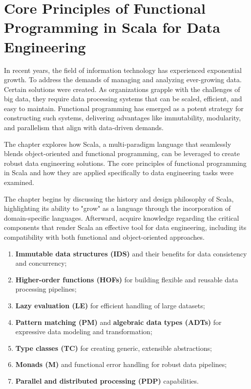 \chapter{Core Principles of Functional Programming in Scala for Data Engineering}

In recent years, the field of information technology has experienced exponential growth. To address the demands of managing and analyzing ever-growing data. Certain solutions were created. As organizations grapple with the challenges of big data, they require data processing systems that can be scaled, efficient, and easy to maintain. Functional programming has emerged as a potent strategy for constructing such systems, delivering advantages like immutability, modularity, and parallelism that align with data-driven demands.

The chapter explores how Scala, a multi-paradigm language that seamlessly blends object-oriented and functional programming, can be leveraged to create robust data engineering solutions. The core principles of functional programming in Scala and how they are applied specifically to data engineering tasks were examined.

The chapter begins by discussing the history and design philosophy of Scala, highlighting its ability to "grow" as a language through the incorporation of domain-specific languages. Afterward, acquire knowledge regarding the critical components that render Scala an effective tool for data engineering, including its compatibility with both functional and object-oriented approaches.

    \begin{enumerate}
        \item \textbf{Immutable data structures (IDS)} and their benefits for data consistency and concurrency;
        \item \textbf{Higher-order functions (HOFs)} for building flexible and reusable data processing pipelines;
        \item \textbf{Lazy evaluation (LE)} for efficient handling of large datasets;
        \item \textbf{Pattern matching (PM)} and \textbf{algebraic data types (ADTs)} for expressive data modeling and transformation;
        \item \textbf{Type classes (TC)} for creating generic, extensible abstractions;
        \item \textbf{Monads (M)} and functional error handling for robust data pipelines;
        \item \textbf{Parallel and distributed processing (PDP)} capabilities.
    \end{enumerate}

